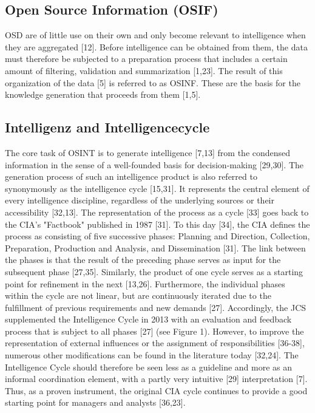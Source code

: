 \documentclass[10pt]{article}
\begin{document}
\subsection{Open Source Information (OSIF)}
OSD are of little use on their own and only become relevant to intelligence when they are aggregated [12]. Before intelligence can be obtained from them, the data must therefore be subjected to a preparation process that includes a certain amount of filtering, validation and summarization [1,23]. The result of this organization of the data [5] is referred to as OSINF. These are the basis for the knowledge generation that proceeds from them [1,5].

\subsection{Intelligenz and Intelligencecycle}
The core task of OSINT is to generate intelligence [7,13] from the condensed information in the sense of a well-founded basis for decision-making [29,30]. The generation process of such an intelligence product is also referred to synonymously as the intelligence cycle [15,31]. It represents the central element of every intelligence discipline, regardless of the underlying sources or their accessibility [32,13]. The representation of the process as a cycle [33] goes back to the CIA's "Factbook" published in 1987 [31]. To this day [34], the CIA defines the process as consisting of five successive phases: Planning and Direction, Collection, Preparation, Production and Analysis, and Dissemination [31]. The link between the phases is that the result of the preceding phase serves as input for the subsequent phase [27,35]. Similarly, the product of one cycle serves as a starting point for refinement in the next [13,26]. Furthermore, the individual phases within the cycle are not linear, but are continuously iterated due to the fulfillment of previous requirements and new demands [27]. Accordingly, the JCS supplemented the Intelligence Cycle in 2013 with an evaluation and feedback process that is subject to all phases [27] (see Figure 1). However, to improve the representation of external influences or the assignment of responsibilities [36-38], numerous other modifications can be found in the literature today [32,24]. The Intelligence Cycle should therefore be seen less as a guideline and more as an informal coordination element, with a partly very intuitive [29] interpretation [7]. Thus, as a proven instrument, the original CIA cycle continues to provide a good starting point for managers and analysts [36,23].
\end{document}
